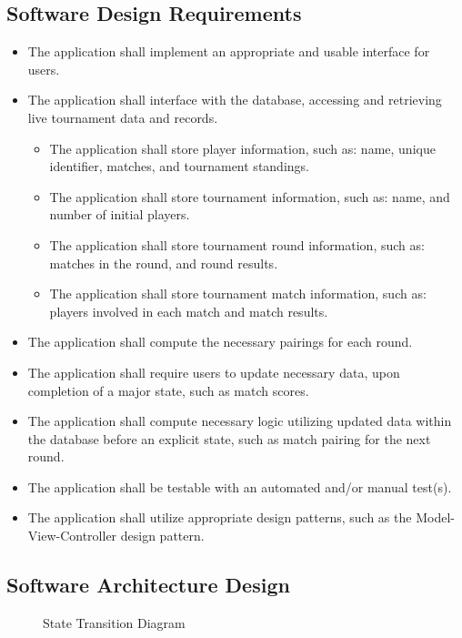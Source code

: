 \documentclass[11pt]{article}
\begin{document}
    \subsection{Software Design Requirements}
    \begin{itemize}
        \item The application shall implement an appropriate and usable interface for users.
        \item The application shall interface with the database, accessing and retrieving live tournament data and records.
        \begin{itemize}
            \item The application shall store player information, such as: name, unique identifier, matches, and tournament standings.
            \item The application shall store tournament information, such as: name, and number of initial players.
            \item The application shall store tournament round information, such as: matches in the round, and round results.
            \item The application shall store tournament match information, such as: players involved in each match and match results.
        \end{itemize}
        \item The application shall compute the necessary pairings for each round.
        \item The application shall require users to update necessary data, upon completion of a major state, such as match scores.
        \item The application shall compute necessary logic utilizing updated data within the database before an explicit state, such as match pairing for the next round.
        \item The application shall be testable with an automated and/or manual test(s).
        \item The application shall utilize appropriate design patterns, such as the Model-View-Controller design pattern.
    \end{itemize}
    
    \subsection{Software Architecture Design}
    \begin{figure}[h]
        \centering
        \caption{State Transition Diagram}
    \end{figure}
    
\end{document}
